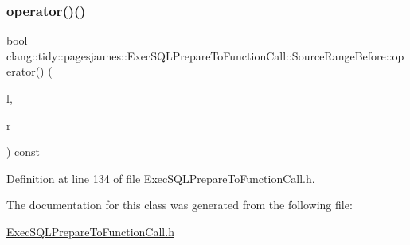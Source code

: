 \subsubsection{\texorpdfstring{operator()()}{operator()()}}
{\footnotesize\ttfamily bool clang\+::tidy\+::pagesjaunes\+::\+Exec\+S\+Q\+L\+Prepare\+To\+Function\+Call\+::\+Source\+Range\+Before\+::operator() (\begin{DoxyParamCaption}\item[{const \hyperlink{classclang_1_1tidy_1_1pagesjaunes_1_1_exec_s_q_l_prepare_to_function_call_1_1_source_range_for_string_literals}{Source\+Range\+For\+String\+Literals} \&}]{l,  }\item[{const \hyperlink{classclang_1_1tidy_1_1pagesjaunes_1_1_exec_s_q_l_prepare_to_function_call_1_1_source_range_for_string_literals}{Source\+Range\+For\+String\+Literals} \&}]{r }\end{DoxyParamCaption}) const\hspace{0.3cm}{\ttfamily [inline]}}



Definition at line 134 of file Exec\+S\+Q\+L\+Prepare\+To\+Function\+Call.\+h.



The documentation for this class was generated from the following file\+:\begin{DoxyCompactItemize}
\item 
\hyperlink{_exec_s_q_l_prepare_to_function_call_8h}{Exec\+S\+Q\+L\+Prepare\+To\+Function\+Call.\+h}\end{DoxyCompactItemize}
